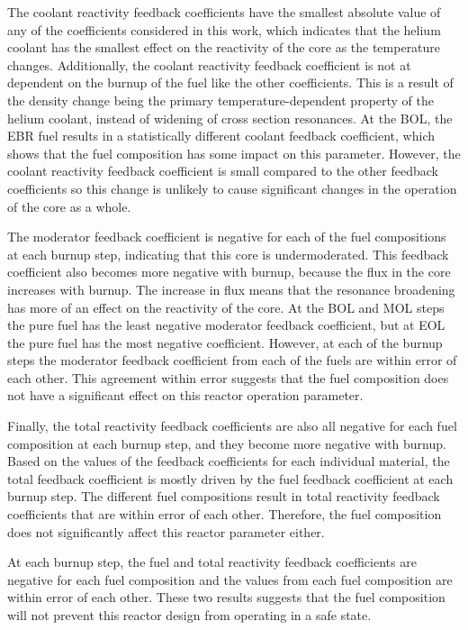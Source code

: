 The coolant reactivity feedback coefficients have the smallest absolute 
value of any of the coefficients considered in this work, which 
indicates that the helium coolant has the smallest effect on the reactivity 
of the core as the temperature changes. Additionally, the coolant 
reactivity feedback coefficient is not at dependent on the burnup of the 
fuel like the other coefficients. This is a result of the density change 
being the primary temperature-dependent property of the helium coolant, 
instead of widening of cross section resonances. 
At the \gls{BOL}, the \gls{EBR} fuel results in a statistically different 
coolant feedback coefficient, which shows that the fuel composition has some 
impact on this parameter. However, the coolant reactivity feedback 
coefficient is small compared to the other feedback coefficients so this 
change is unlikely to cause significant changes in the operation of the 
core as a whole. 

The moderator feedback coefficient is negative for each of the fuel 
compositions at each burnup step, indicating that this core is 
undermoderated. This feedback coefficient also becomes more 
negative with burnup, because the flux in the core increases with 
burnup. The increase in flux means that the resonance broadening has more 
of an effect on the reactivity of the core. At the \gls{BOL} and 
\gls{MOL} steps the pure fuel has the least negative moderator 
feedback coefficient, but at \gls{EOL} the pure fuel has the most 
negative coefficient. However, at each of the burnup steps the moderator 
feedback coefficient from each of the fuels are within error of each 
other. This agreement within error suggests that the fuel composition 
does not have a significant effect on this reactor operation parameter. 

Finally, the total reactivity feedback coefficients are also all negative 
for each fuel composition at each burnup step, and they become more 
negative with burnup. Based on the values of the feedback 
coefficients for each individual material, the total feedback coefficient 
is mostly driven by the fuel feedback coefficient at each burnup step. 
The different fuel compositions result in total reactivity feedback 
coefficients that are within error of each other. Therefore, the fuel 
composition does not significantly affect this reactor parameter either. 

At each burnup step, the fuel and total reactivity feedback coefficients are 
negative for each fuel composition and the values from each fuel composition 
are within error of each other. These two results suggests that the fuel 
composition will not prevent this reactor design from operating in a safe 
state. 